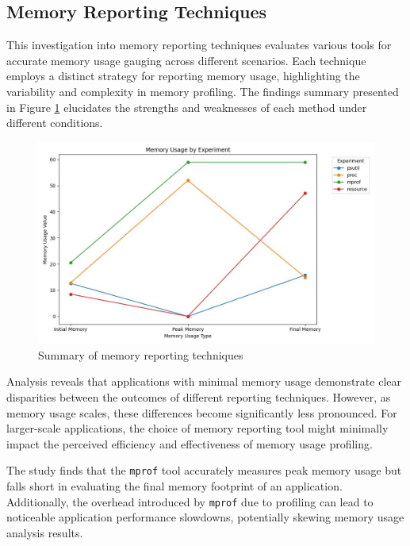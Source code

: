 \subsection{Memory Reporting Techniques}

This investigation into memory reporting techniques evaluates various tools for accurate memory usage gauging across different scenarios.
Each technique employs a distinct strategy for reporting memory usage, highlighting the variability and complexity in memory profiling.
The findings summary presented in Figure \ref{fig:memory-reporting-summary} elucidates the strengths and weaknesses of each method under different conditions.

\begin{figure}[ht]
    \centering
    \includegraphics[width=\linewidth]{artifacts/result-memory-reporting-techniques.jpg}
    \caption{Summary of memory reporting techniques}
    \label{fig:memory-reporting-summary}
\end{figure}

Analysis reveals that applications with minimal memory usage demonstrate clear disparities between the outcomes of different reporting techniques.
However, as memory usage scales, these differences become significantly less pronounced.
For larger-scale applications, the choice of memory reporting tool might minimally impact the perceived efficiency and effectiveness of memory usage profiling.

The study finds that the \texttt{mprof} tool accurately measures peak memory usage but falls short in evaluating the final memory footprint of an application.
Additionally, the overhead introduced by \texttt{mprof} due to profiling can lead to noticeable application performance slowdowns, potentially skewing memory usage analysis results.

